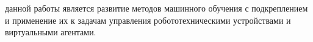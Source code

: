 


{\aim} данной работы является развитие методов машинного обучения с подкреплением и применение их к задачам управления робототехническими устройствами и виртуальными агентами. 


